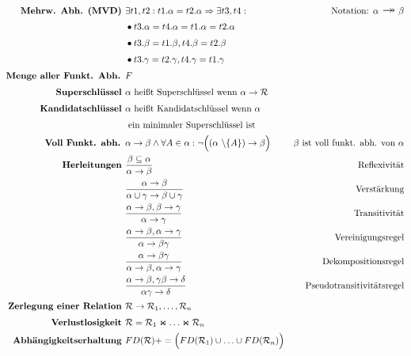 \documentclass{article}
\newcommand{\fvd}{\mathlarger{\ \mathlarger{\twoheadrightarrow}}\ }
\begin{document}
		\begin{align*}
			\textbf{Mehrw. Abh. (MVD) } & \exists t1, t2: t1.\alpha = t2.\alpha \Rightarrow \exists t3,t4: & \text{Notation: } \alpha \fvd \beta \\
			& \bullet t3.\alpha = t4.\alpha = t1.\alpha = t2.\alpha\\
			& \bullet t3.\beta = t1.\beta, t4.\beta = t2.\beta\\
			& \bullet t3.\gamma = t2.\gamma, t4.\gamma = t1.\gamma\\
			\textbf{Menge aller Funkt. Abh. } & F\\
			\textbf{Superschl\"ussel } & \alpha \text{ hei\ss t Superschl\"ussel wenn } \alpha \rightarrow \mathcal{R}\\
			\textbf{Kandidatschl\"ussel } & \alpha \text{ hei\ss t Kandidatschl\"ussel wenn } \alpha \\ & \text{ ein minimaler Superschl\"ussel ist}\\
			\textbf{Voll Funkt. abh. } & \alpha \rightarrow \beta \wedge \forall A \in \alpha: \neg \Big( (\alpha\ \backslash \{A\} ) \rightarrow \beta \Big)& \beta \text{ ist voll funkt. abh. von } \alpha\\
			\textbf{Herleitungen } & \frac{\beta \subseteq \alpha}{\alpha \rightarrow \beta} & \text{Reflexivit\"at}\\
			& \frac{\alpha \rightarrow \beta}{\alpha\cup\gamma \rightarrow \beta\cup\gamma} & \text{Verst\"arkung}\\
			& \frac{\alpha \rightarrow \beta, \beta \rightarrow \gamma}{\alpha\rightarrow\gamma} & \text{Transitivit\"at}\\
			& \frac{\alpha \rightarrow \beta, \alpha \rightarrow \gamma}{\alpha \rightarrow \beta\gamma} & \text{Vereinigungsregel}\\
			& \frac{\alpha \rightarrow \beta\gamma}{\alpha \rightarrow \beta, \alpha \rightarrow \gamma} & \text{Dekompositionsregel}\\
			& \frac{\alpha \rightarrow \beta, \gamma\beta \rightarrow \delta}{\alpha\gamma \rightarrow \delta} & \text{Pseudotransitivit\"atsregel}\\
			\textbf{Zerlegung einer Relation } & \mathcal{R} \rightarrow \mathcal{R}_1, \ldots, \mathcal{R}_n\\
			\textbf{Verlustlosigkeit } & \mathcal{R} = \mathcal{R}_1 \Join \ldots \Join \mathcal{R}_n\\
			\textbf{Abh\"angigkeitserhaltung } & FD(\mathcal{R})+ = \Big(FD(\mathcal{R}_1) \cup \ldots \cup FD(\mathcal{R}_n) \Big)\\
		\end{align*}
\end{document}
